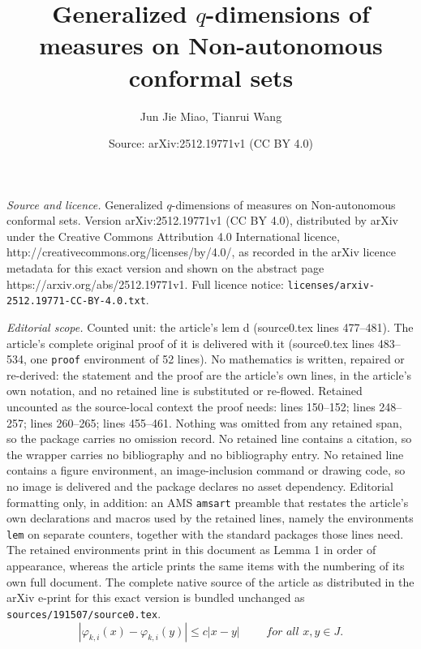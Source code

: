 \documentclass[10pt,a4paper]{amsart}
\title{Generalized $q$-dimensions of measures on Non-autonomous conformal sets}
\author{Jun Jie Miao, Tianrui Wang}
\date{Source: arXiv:2512.19771v1 (CC BY 4.0)}
\begin{document}
\maketitle

\noindent\emph{Source and licence.} Generalized $q$-dimensions of measures on Non-autonomous conformal sets. Version arXiv:2512.19771v1 (CC BY 4.0), distributed by arXiv under the Creative Commons Attribution 4.0 International licence, http://creativecommons.org/licenses/by/4.0/, as recorded in the arXiv licence metadata for this exact version and shown on the abstract page https://arxiv.org/abs/2512.19771v1. Full licence notice: \texttt{licenses/arxiv-2512.19771-CC-BY-4.0.txt}.\par\smallskip

\noindent\textit{Editorial scope.} Counted unit: the article's lem d (source0.tex lines 477--481). The article's complete original proof of it is delivered with it (source0.tex lines 483--534, one \texttt{proof} environment of 52 lines). No mathematics is written, repaired or re-derived: the statement and the proof are the article's own lines, in the article's own notation, and no retained line is substituted or re-flowed.  Retained uncounted as the source-local context the proof needs: lines 150--152; lines 248--257; lines 260--265; lines 455--461.  Nothing was omitted from any retained span, so the package carries no omission record.  No retained line contains a citation, so the wrapper carries no bibliography and no bibliography entry.  No retained line contains a figure environment, an image-inclusion command or drawing code, so no image is delivered and the package declares no asset dependency.  Editorial formatting only, in addition: an AMS \texttt{amsart} preamble that restates the article's own declarations and macros used by the retained lines, namely the environments \texttt{lem} on separate counters, together with the standard packages those lines need.  The retained environments print in this document as Lemma 1 in order of appearance, whereas the article prints the same items with the numbering of its own full document.  The complete native source of the article as distributed in the arXiv e-print for this exact version is bundled unchanged as \texttt{sources/191507/source0.tex}.
\begin{equation} \label{def_uccdn}
|\varphi_{k, i}(x)-\varphi_{k, i}(y)|\le  c|x-y| \qquad \textit{ for all }  x, y\in J.
\end{equation}
\end{document}
